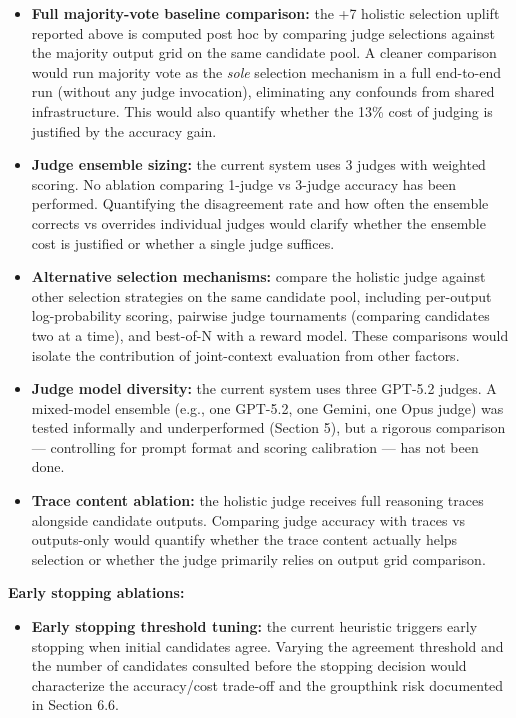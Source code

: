 \documentclass[11pt]{article}
\providecommand{\tightlist}{%
  \setlength{\itemsep}{0pt}\setlength{\parskip}{0pt}}
\begin{document}
\begin{itemize}
\tightlist
\item
  \textbf{Full majority-vote baseline comparison:} the +7 holistic
  selection uplift reported above is computed post hoc by comparing
  judge selections against the majority output grid on the same
  candidate pool. A cleaner comparison would run majority vote as the
  \emph{sole} selection mechanism in a full end-to-end run (without any
  judge invocation), eliminating any confounds from shared
  infrastructure. This would also quantify whether the 13\% cost of
  judging is justified by the accuracy gain.
\item
  \textbf{Judge ensemble sizing:} the current system uses 3 judges with
  weighted scoring. No ablation comparing 1-judge vs 3-judge accuracy
  has been performed. Quantifying the disagreement rate and how often
  the ensemble corrects vs overrides individual judges would clarify
  whether the ensemble cost is justified or whether a single judge
  suffices.
\item
  \textbf{Alternative selection mechanisms:} compare the holistic judge
  against other selection strategies on the same candidate pool,
  including per-output log-probability scoring, pairwise judge
  tournaments (comparing candidates two at a time), and best-of-N with a
  reward model. These comparisons would isolate the contribution of
  joint-context evaluation from other factors.
\item
  \textbf{Judge model diversity:} the current system uses three GPT-5.2
  judges. A mixed-model ensemble (e.g., one GPT-5.2, one Gemini, one
  Opus judge) was tested informally and underperformed (Section 5), but
  a rigorous comparison --- controlling for prompt format and scoring
  calibration --- has not been done.
\item
  \textbf{Trace content ablation:} the holistic judge receives full
  reasoning traces alongside candidate outputs. Comparing judge accuracy
  with traces vs outputs-only would quantify whether the trace content
  actually helps selection or whether the judge primarily relies on
  output grid comparison.
\end{itemize}

\textbf{Early stopping ablations:}

\begin{itemize}
\tightlist
\item
  \textbf{Early stopping threshold tuning:} the current heuristic
  triggers early stopping when initial candidates agree. Varying the
  agreement threshold and the number of candidates consulted before the
  stopping decision would characterize the accuracy/cost trade-off and
  the groupthink risk documented in Section 6.6.
\end{itemize}
\end{document}
